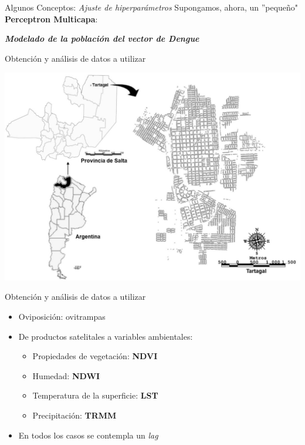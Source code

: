 \documentclass[10pt]{beamer}
\newcommand\IncrFont{\fontsize{20}{20}\selectfont}
\begin{document}
\begin{frame}{Algunos Conceptos: \textit{Ajuste de hiperparámetros}}
  Supongamos, ahora, un ''pequeño" \textbf{Perceptron Multicapa}:
  \pause

  \mlp
\end{frame}



\begin{frame}{}
  \IncrFont
  \begin{center}
    \textit{\textbf{Modelado de la población del vector de Dengue}}
  \end{center}
\end{frame}


\begin{frame}{Obtención y análisis de datos a utilizar}
  \begin{center}
    \includegraphics[width=.8\textwidth]{tartagal}
  \end{center}
\end{frame}


\begin{frame}{Obtención y análisis de datos a utilizar}
\begin{itemize}[<+->]
  \item Oviposición: ovitrampas
  \item De productos satelitales a variables ambientales:
      \begin{itemize}
        \item Propiedades de vegetación: \textbf{NDVI}
        \item Humedad: \textbf{NDWI}
        \item Temperatura de la superficie: \textbf{LST}
        \item Precipitación: \textbf{TRMM}
      \end{itemize}
  \item En todos los casos se contempla un \textit{lag}
\end{itemize}
\end{frame}
\end{document}
